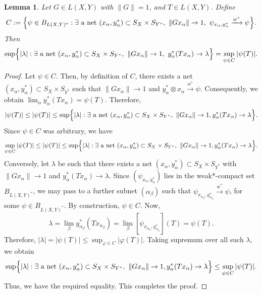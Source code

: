 \documentclass[12pt]{amsart}
\newtheorem{lemma}[theorem]{Lemma}
\theoremstyle{definition}
\numberwithin{equation}{section}
\begin{document}
    \begin{lemma}\label{dual:lem1}
        Let $G \in L(X,Y)$ with $\|G\|=1$, and $T \in L(X,Y)$. Define
        \[
        C :=\Bigl\{ \psi \in B_{L(X,Y)^*} : \exists\ \text{a net}\ (x_\alpha, y_\alpha^*) \subset S_X \times S_{Y^*},\ \|Gx_\alpha\|\to 1,\ \psi_{x_\alpha, y_\alpha^*} \xrightarrow{w^*} \psi\Bigr\}.
        \]
        Then
        \[
        \sup \Bigl\{ |\lambda| : \exists\ \text{a net}\ (x_\alpha, y_\alpha^*) \subset S_X \times S_{Y^*},\ \|Gx_\alpha\| \to 1,\ y_\alpha^*(Tx_\alpha)\to\lambda \Bigr\} = \sup_{\psi \in C} |\psi(T)|.
        \]
    \end{lemma}

    \begin{proof}
        Let $\psi \in C$. Then, by definition of $C$, there exists a net $(x_\alpha, y_\alpha^*) \subset S_X \times S_{Y^*}$ such that $\|Gx_\alpha\| \to 1$ and $y_\alpha^* \otimes x_\alpha \xrightarrow{w^*} \psi.$ Consequently, we obtain $\lim_{\alpha} y_\alpha^*(Tx_\alpha)= \psi(T).$ Therefore,
        \[
        |\psi(T)| \le |\psi(T)| \le \sup \Bigl\{ |\lambda| : \exists\ \text{a net}\ (x_\alpha, y_\alpha^*) \subset S_X \times S_{Y^*},\ \|Gx_\alpha\| \to 1, y_\alpha^*(Tx_\alpha)\to\lambda \Bigr\}.
        \]
        Since $\psi \in C$ was arbitrary, we have
        \[
        \sup_{\psi \in C} |\psi(T)|\le |\psi(T)| \le \sup \Bigl\{ |\lambda| : \exists\ \text{a net}\ (x_\alpha, y_\alpha^*) \subset S_X \times S_{Y^*},\ \|Gx_\alpha\| \to 1, y_\alpha^*(Tx_\alpha)\to\lambda \Bigr\}.
        \]
        Conversely, let $\lambda$ be such that there exists a net $(x_\alpha, y_\alpha^*) \subset S_X \times S_{Y^*}$ with $\|Gx_\alpha\| \to 1$ and $y_\alpha^*(Tx_\alpha)\to\lambda.$ Since $(\psi_{x_\alpha, y_\alpha^*})$ lies in the weak*-compact set $B_{L(X,Y)^*}$, we may pass to a further subnet $(\alpha_\beta)$ such that $\psi_{x_{\alpha_\beta}, y_{\alpha_\beta}^*} \xrightarrow{w^*} \psi$, for some $\psi \in B_{L(X,Y)^*}$. By construction, $\psi \in C$. Now,
        \[
        \lambda = \lim_{\beta} y_{\alpha_\beta}^*(Tx_{\alpha_\beta}) = \lim_{\beta} [\psi_{x_{\alpha_\beta}, y_{\alpha_\beta}^*}](T) = \psi(T).
        \]
        Therefore, $|\lambda| = |\psi(T)| \le \sup_{\varphi \in C} |\varphi(T)|.$ Taking supremum over all such $\lambda$, we obtain
        \[
        \sup \Bigl\{ |\lambda| : \exists\ \text{a net}\ (x_\alpha, y_\alpha^*) \subset S_X \times S_{Y^*},\ \|Gx_\alpha\| \to 1, y_\alpha^*(Tx_\alpha)\to\lambda \Bigr\}\le \sup_{\psi \in C} |\psi(T)|.
        \]
        Thus, we have the required equality. This completes the proof.
    \end{proof}
\end{document}
